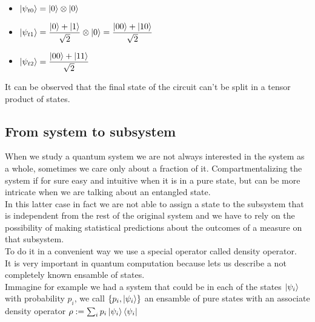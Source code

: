\documentclass{article}
\begin{document}
\begin{center}
\end{center}
\begin{itemize}
	\item $\ket{\psi_{t0}} = \ket{0} \otimes \ket{0}$
	\item $\ket{\psi_{t1}} = \dfrac{\ket{0}+\ket{1}}{\sqrt{2}} \otimes \ket{0} = \dfrac{\ket{00}+\ket{10}}{\sqrt{2}}$
	\item $\ket{\psi_{t2}} = \dfrac{\ket{00}+\ket{11}}{\sqrt{2}}$

\end{itemize}
It can be observed that the final state of the circuit can't be split
in a tensor product of states.

\subsection{From system to subsystem}

When we study a quantum system we are not always interested in the
system
as a whole, sometimes we care only about a fraction of it.
Compartmentalizing the system if for sure easy and intuitive when it
is in a pure state, but can be more intricate when we are talking about
an entangled state.\\
In this latter case in fact we are not able to assign a state to the
subsystem that is independent from the rest of the original system
and we have to rely on the possibility of making statistical
predictions
about the outcomes of a measure on that subsystem.\\
To do it in a convenient way we use a special operator called density
operator.\\
It is very important in quantum computation because lets us describe
a not completely known ensamble of states.\\
Immagine for example we had a system that could be in each of the
states
$\ket{\psi_i}$ with probability $p_i$, we call $\{p_i,\ket{\psi_i}\}$ an
ensamble of pure states with an associate density operator
$\rho:=\sum_i p_i \ket{\psi_i}\bra{\psi_i} $
\end{document}

